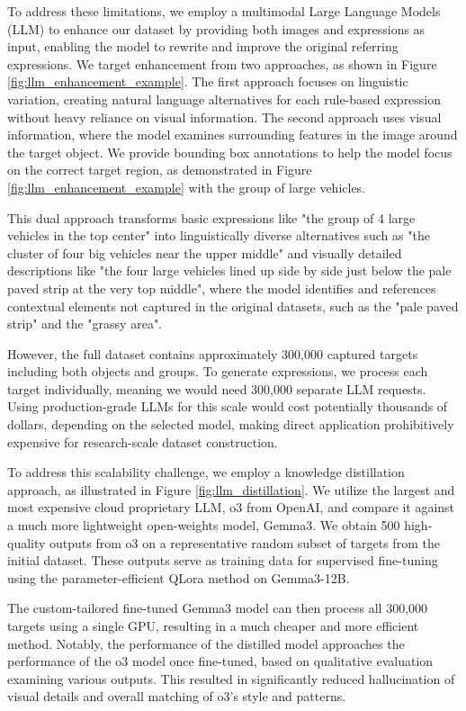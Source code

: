 To address these limitations, we employ a multimodal Large Language Models (LLM) to enhance our dataset by providing both images and expressions as input, enabling the model to rewrite and improve the original referring expressions. We target enhancement from two approaches, as shown in Figure \ref{fig:llm_enhancement_example}. The first approach focuses on linguistic variation, creating natural language alternatives for each rule-based expression without heavy reliance on visual information. The second approach uses visual information, where the model examines surrounding features in the image around the target object. We provide bounding box annotations to help the model focus on the correct target region, as demonstrated in Figure \ref{fig:llm_enhancement_example} with the group of large vehicles.

This dual approach transforms basic expressions like "the group of 4 large vehicles in the top center" into linguistically diverse alternatives such as "the cluster of four big vehicles near the upper middle" and visually detailed descriptions like "the four large vehicles lined up side by side just below the pale paved strip at the very top middle", where the model identifies and references contextual elements not captured in the original datasets, such as the "pale paved strip" and the "grassy area".

However, the full dataset contains approximately 300,000 captured targets including both objects and groups. To generate expressions, we process each target individually, meaning we would need 300,000 separate LLM requests. Using production-grade LLMs for this scale would cost potentially thousands of dollars, depending on the selected model, making direct application prohibitively expensive for research-scale dataset construction.

To address this scalability challenge, we employ a knowledge distillation approach, as illustrated in Figure \ref{fig:llm_distillation}. We utilize the largest and most expensive cloud proprietary LLM, o3 from OpenAI, and compare it against a much more lightweight open-weights model, Gemma3. We obtain 500 high-quality outputs from o3 on a representative random subset of targets from the initial dataset. These outputs serve as training data for supervised fine-tuning using the parameter-efficient QLora method on Gemma3-12B.

The custom-tailored fine-tuned Gemma3 model can then process all 300,000 targets using a single GPU, resulting in a much cheaper and more efficient method. Notably, the performance of the distilled model approaches the performance of the o3 model once fine-tuned, based on qualitative evaluation examining various outputs. This resulted in significantly reduced hallucination of visual details and overall matching of o3's style and patterns.

